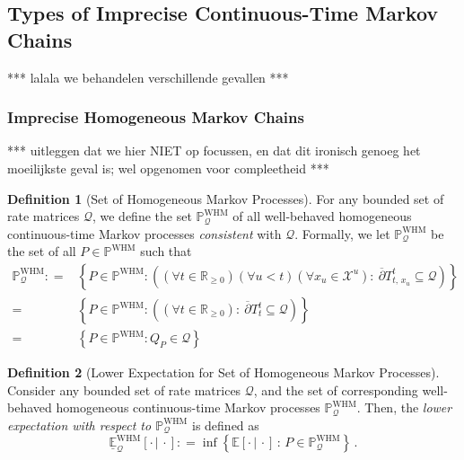 \documentclass[10pt]{paper}
\theoremstyle{definition}
\newtheorem{definition}{Definition}
\newcommand{\reals}{\mathbb{R}}
\newcommand{\realsnonneg}{\reals_{\geq 0}}
\newcommand{\states}{\mathcal{X}}
\newcommand{\processes}{\mathbb{P}}
\newcommand{\whmprocesses}{\processes^{\mathrm{WHM}}}
\newcommand{\rateset}{\mathcal{Q}}
\newcommand{\coloneqq}{:\!=}
\begin{document}
\subsection{Types of Imprecise Continuous-Time Markov Chains}

*** lalala we behandelen verschillende gevallen ***

\subsubsection{Imprecise Homogeneous Markov Chains}

*** uitleggen dat we hier NIET op focussen, en dat dit ironisch genoeg het moeilijkste geval is; wel opgenomen voor compleetheid ***
\begin{definition}[Set of Homogeneous Markov Processes]\label{def:homogen_markov_process_set_new}
For any bounded set of rate matrices $\rateset$, we define the set $\whmprocesses_{\rateset}$ of all well-behaved homogeneous continuous-time Markov processes \emph{consistent} with $\rateset$. Formally, we let $\whmprocesses_{\rateset}$ be the set of all $P\in\whmprocesses$ such that
\begin{align*}
\whmprocesses_\rateset
\coloneqq&
\left\{
P\in\whmprocesses
\colon
\left((\forall t\in\realsnonneg)(\forall u<t)(\forall x_u\in\states^u):~
\overline{\partial}
{T^t_{t,\,x_u}}\subseteq\rateset
\right)\right\}\\
=&
\left\{
P\in\whmprocesses
\colon
\left((\forall t\in\realsnonneg):~
\overline{\partial}
{T^t_{t}}\subseteq\rateset
\right)\right\}\\
=&
\left\{
P\in\whmprocesses
\colon
Q_P\in\rateset
\right\}
\end{align*}
\end{definition}

\begin{definition}[Lower Expectation for Set of Homogeneous Markov Processes]\label{def:lower_homogen_markov} Consider any bounded set of rate matrices $\rateset$, and the set of corresponding well-behaved homogeneous continuous-time Markov processes $\whmprocesses_\rateset$. Then, the \emph{lower expectation with respect to $\whmprocesses_\rateset$} is defined as
\begin{equation*}
\underline{\mathbb{E}}_\rateset^\mathrm{WHM}[\cdot\,\vert\,\cdot] \coloneqq \inf\left\{\mathbb{E}[\cdot\,\vert\,\cdot]\,:\,P\in\whmprocesses_\rateset\right\}\,.
\end{equation*}
\end{definition}
\end{document}
